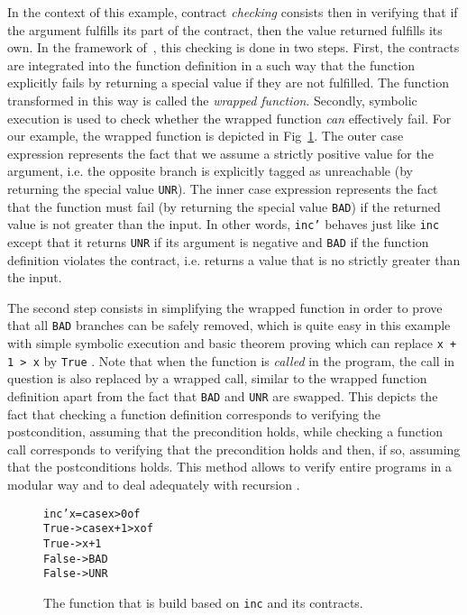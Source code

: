 \documentclass[submission,copyright,creativecommons]{eptcs}
\begin{document}
In the context of this example, contract \emph{checking} consists then in verifying that if the argument fulfills its part of the contract, then the value returned fulfills its own. In the framework of~\cite{static-contract-checking}, this checking is done in two steps. First, the contracts are integrated into the function definition in a such way that the function explicitly fails by returning a special value if they are not fulfilled. 
The function transformed in this way is called the \emph{wrapped function}.
Secondly, symbolic execution is used to check whether the wrapped function \emph{can} effectively fail. For our example, the wrapped function is depicted in Fig~\ref{fig:inc:step1}. 
The outer case expression represents the fact that we assume a strictly positive value for the argument, i.e. the opposite branch is explicitly tagged as unreachable (by returning the special value \texttt{UNR}). The inner case expression represents the fact that the function must fail (by returning the special value \texttt{BAD}) if the returned value is not greater than the input. In other words, \texttt{inc'} behaves just like \texttt{inc}  except that it returns \texttt{UNR} if its argument is negative and \texttt{BAD} if the function definition violates the contract, i.e. returns a value that is no strictly greater than the input.

The second step consists in simplifying the wrapped function in order to prove that all \texttt{BAD} branches can be safely removed, 
which is quite easy in this example with simple symbolic execution and basic theorem proving which can replace \texttt{x + 1 > x} by \texttt{True} \cite{static-contract-checking}.
Note that when the function is \emph{called}  
in the program, the call in question is also replaced by a wrapped call, similar to the wrapped function definition apart from the fact that \texttt{BAD} and \texttt{UNR} are swapped. 
This depicts the fact that checking a function definition corresponds to verifying the postcondition, assuming that the precondition holds, while checking a function call corresponds to verifying that the precondition holds and then, if so, assuming that the postconditions holds.
This method allows to verify entire programs in a modular way and to deal adequately with recursion \cite{static-contract-checking}.

\begin{figure}[htb]
  \centering
  \begin{footnotesize}
\begin{alltt}
inc' x = case x > 0 of 
           True -> case x + 1 > x of
                     True  -> x+1
                     False -> BAD
           False -> UNR 
\end{alltt}
  \end{footnotesize}
  \caption{The function that is build based on \texttt{inc} and its contracts.}
  \label{fig:inc:step1}
\end{figure}
\end{document}
